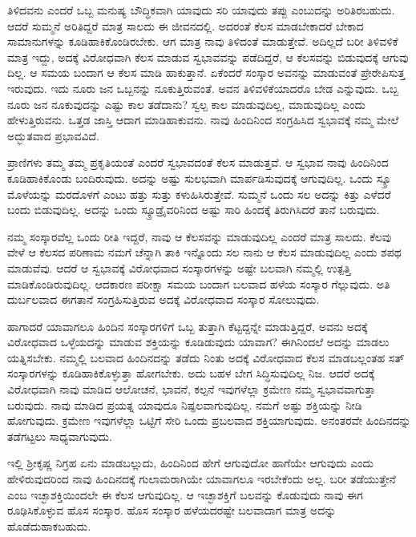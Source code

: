 ತಿಳಿದವನು ಎಂದರೆ ಒಬ್ಬ ಮನುಷ್ಯ ಬೌದ್ಧಿಕವಾಗಿ ಯಾವುದು ಸರಿ ಯಾವುದು ತಪ್ಪು ಎಂಬುದನ್ನು ಅರಿತಿರಬಹುದು. ಆದರೆ ಸುಮ್ಮನೆ ಅರಿತಿದ್ದರೆ ಮಾತ್ರ ಸಾಲದು ಈ ಜೀವನದಲ್ಲಿ. ಅದರಂತೆ ಕೆಲಸ ಮಾಡಬೇಕಾದರೆ ಬೇಕಾದ ಸಾಮಾನುಗಳನ್ನು ಕೂಡಿಹಾಕಿಕೊಂಡಿರಬೇಕು. ಆಗ ಮಾತ್ರ ನಾವು ತಿಳಿದಂತೆ ಮಾಡುತ್ತೇವೆ. ಅದಿಲ್ಲದೆ ಬರೀ ತಿಳಿವಳಿಕೆ ಮಾತ್ರ ಇದ್ದು, ಅದಕ್ಕೆ ವಿರೋಧವಾಗಿ ಕೆಲಸ ಮಾಡುವ ಸ್ವಭಾವವನ್ನು ಪಡೆದಿದ್ದರೆ, ಆ ಕೆಲಸವನ್ನು ಬಿಡುವುದಕ್ಕೆ ಆಗುವು ದಿಲ್ಲ. ಆ ಸಮಯ ಬಂದಾಗ ಆ ಕೆಲಸ ಮಾಡಿ ಹಾಕುತ್ತಾನೆ. ಏಕೆಂದರೆ ಸಂಸ್ಕಾರ ಅವನನ್ನು ಮಾಡುವಂತೆ ಪ್ರೇರೇಪಿಸುತ್ತ ಇರುವುದು. ಇದು ನೂರು ಜನ ಒಬ್ಬನನ್ನು ನೂಕುತ್ತಿರುವಂತೆ. ಅವನ ತಿಳಿವಳಿಕೆಯಾದರೊ ಬೇಡ ಎನ್ನುವುದು. ಒಬ್ಬ ನೂರು ಜನ ನೂಕುವುದನ್ನು ಎಷ್ಟು ಕಾಲ ತಡೆದಾನು? ಸ್ವಲ್ಪ ಕಾಲ ಮಾಡುವುದಿಲ್ಲ, ಮಾಡುವುದಿಲ್ಲ ಎಂದು ಹೇಳುತ್ತಿರುವನು. ಒತ್ತಡ ಜಾಸ್ತಿ ಆದಾಗ ಮಾಡಿಹಾಕುವನು. ನಾವು ಹಿಂದಿನಿಂದ ಸಂಗ್ರಹಿಸಿದ ಸ್ವಭಾವಕ್ಕೆ ನಮ್ಮ ಮೇಲೆ ಅದ್ಭುತವಾದ ಪ್ರಭಾವವಿದೆ.

ಪ್ರಾಣಿಗಳು ತಮ್ಮ ತಮ್ಮ ಪ್ರಕೃತಿಯಂತೆ ಎಂದರೆ ಸ್ವಭಾವದಂತೆ ಕೆಲಸ ಮಾಡುತ್ತವೆ. ಆ ಸ್ವಭಾವ ನಾವು ಹಿಂದಿನಿಂದ ಕೂಡಿಹಾಕಿಕೊಂಡು ಬಂದಿರುವುದು. ಅದನ್ನು ಅಷ್ಟು ಸುಲಭವಾಗಿ ಮಾರ್ಪಡಿಸುವುದಕ್ಕೆ ಆಗುವುದಿಲ್ಲ. ಒಂದು ಸ್ಕ್ರೂ ಮೊಳೆಯನ್ನು ಮರದೊಳಗೆ ಎಂಟು ಹತ್ತು ಸುತ್ತು ಕಳುಹಿಸಿರುತ್ತೇವೆ. ಸುಮ್ಮನೆ ಒಂದು ಸಲ ಅದನ್ನು ಕಿತ್ತು ಎಳೆದರೆ ಬಂದು ಬಿಡುವುದಿಲ್ಲ. ಅದನ್ನು ಒಂದು ಸ್ಕ್ರೂಡ್ರೈವರಿನಿಂದ ಅಷ್ಟು ಸಾರಿ ಹಿಂದಕ್ಕೆ ತಿರುಗಿಸಿದರೆ ತಾನೆ ಬರುವುದು.

ನಮ್ಮ ಸಂಸ್ಕಾರವೆಲ್ಲ ಒಂದು ರೀತಿ ಇದ್ದರೆ, ನಾವು ಆ ಕೆಲಸವನ್ನು ಮಾಡುವುದಿಲ್ಲ ಎಂದರೆ ಮಾತ್ರ ಸಾಲದು. ಕೆಲವು ವೇಳೆ ಆ ಕೆಲಸದ ಪರಿಣಾಮ ನಮಗೆ ಚೆನ್ನಾಗಿ ತಾಕಿ ಇನ್ನೊಂದು ಸಲ ನಾನು ಆ ಕೆಲಸ ಮಾಡುವುದಿಲ್ಲ ಎಂದು ಶಪಥ ಮಾಡುವೆವು. ಆದರೆ ಆ ಸ್ವಭಾವಕ್ಕೆ ವಿರೋಧವಾದ ಸಂಸ್ಕಾರಗಳನ್ನು ಅಷ್ಟೇ ಬಲವಾಗಿ ನಮ್ಮಲ್ಲಿ ಉತ್ಪತ್ತಿ ಮಾಡಿಕೊಂಡಿರುವುದಿಲ್ಲ. ಆದಕಾರಣ ಪರೀಕ್ಷಾ ಸಮಯ ಬಂದಾಗ ಬಲವಾದ ಹಳೆಯ ಸಂಸ್ಕಾರ ಗೆಲ್ಲುವುದು. ಅತಿ ದುರ್ಬಲವಾದ ಈಗತಾನೆ ಸಂಗ್ರಹಿಸುತ್ತಿರುವ ಅದಕ್ಕೆ ವಿರೋಧವಾದ ಸಂಸ್ಕಾರ ಸೋಲುವುದು.

ಹಾಗಾದರೆ ಯಾವಾಗಲೂ ಹಿಂದಿನ ಸಂಸ್ಕಾರಗಳಿಗೆ ಒಬ್ಬ ತುತ್ತಾಗಿ ಕೆಟ್ಟದ್ದನ್ನೇ ಮಾಡುತ್ತಿದ್ದರೆ, ಅವನು ಅದಕ್ಕೆ ವಿರೋಧವಾದ ಒಳ್ಳೆಯದನ್ನು ಮಾಡುವ ಶಕ್ತಿಯನ್ನು ಕೂಡಿಡುವುದು ಯಾವಾಗ? ಈಗಿನಿಂದಲೆ ಅದನ್ನು ಮಾಡಲು ಯತ್ನಿಸಬೇಕು. ನಮ್ಮಲ್ಲಿ ಬಲವಾದ ಹಿಂದಿನದನ್ನು ತಡೆದು ನಿಂತು ಅದಕ್ಕೆ ವಿರೋಧವಾದ ಕೆಲಸ ಮಾಡಬಲ್ಲಂತಹ ಸತ್ ಸಂಸ್ಕಾರಗಳನ್ನು ಕೂಡಿಹಾಕಿಕೊಳ್ಳುತ್ತಾ ಹೋಗಬೇಕು. ಅದು ಬಹಳ ಬೇಗ ಸಿದ್ಧಿಸುವುದಿಲ್ಲ ನಿಜ. ಆದರೆ ಅದಕ್ಕೆ ವಿರೋಧವಾಗಿ ನಾವು ಮಾಡಿದ ಆಲೋಚನೆ, ಭಾವನೆ, ಕಲ್ಪನೆ ಇವುಗಳೆಲ್ಲಾ ಕ್ರಮೇಣ ನಮ್ಮ ಸ್ವಭಾವವಾಗುತ್ತಾ ಬರುವುದು. ನಾವು ಮಾಡಿದ ಪ್ರಯತ್ನ ಯಾವುದೂ ನಿಷ್ಫಲವಾಗುವುದಿಲ್ಲ. ನಮಗೆ ಅಷ್ಟು ಶಕ್ತಿಯನ್ನು ನೀಡಿ ಹೋಗುವುದು. ಕ್ರಮೇಣ ಇವುಗಳೆಲ್ಲಾ ಒಟ್ಟಿಗೆ ಸೇರಿ ಒಂದು ಪ್ರಬಲವಾದ ಶಕ್ತಿಯಾಗುವುದು. ಅನಂತರವೇ ಹಿಂದಿನದನ್ನು ತಡೆಗಟ್ಟಲು ಸಾಧ್ಯವಾಗುವುದು.

ಇಲ್ಲಿ ಶ‍್ರೀಕೃಷ್ಣ ನಿಗ್ರಹ ಏನು ಮಾಡಬಲ್ಲುದು, ಹಿಂದಿನಿಂದ ಹೇಗೆ ಆಗುವುದೋ ಹಾಗೆಯೇ ಆಗುವುದು ಎಂದು ಹೇಳಿರುವುದರಿಂದ ನಾವು ಹಿಂದಿನದಕ್ಕೆ ಗುಲಾಮರಾಗಿಯೇ ಯಾವಾಗಲೂ ಇರಬೇಕೆಂದು ಅಲ್ಲ. ಬರೀ ತಡೆಯುತ್ತೇನೆ ಎಂಬ ಇಚ್ಛಾಶಕ್ತಿಯಿಂದಲೇ ಈ ಕೆಲಸ ಆಗುವುದಿಲ್ಲ. ಆ ಇಚ್ಛಾಶಕ್ತಿಗೆ ಬಲವನ್ನು ಕೊಡುವುದು ನಾವು ಈಗ ರೂಢಿಸಿಕೊಳ್ಳುವ ಹೊಸ ಸಂಸ್ಕಾರ. ಹೊಸ ಸಂಸ್ಕಾರ ಹಳೆಯದರಷ್ಟೇ ಬಲವಾದಾಗ ಮಾತ್ರ ಅದನ್ನು ಹೊಡೆದುಹಾಕಬಹುದು.

